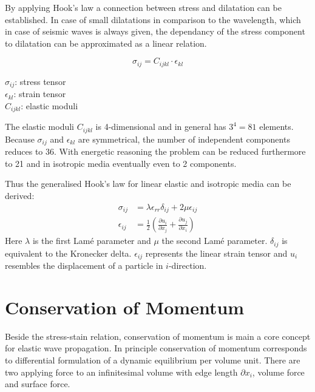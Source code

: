 \documentclass[pdftex,a4paper,parskip,listof=totoc,bibliography=totoc,onehalfspacing,12pt]{scrreprt}
\begin{document}
By applying Hook's law a connection between stress and dilatation  can be established. In case of small dilatations in comparison to the wavelength, which in case of seismic waves is always given, the dependancy of the stress component to dilatation can be approximated as a linear relation.

\begin{minipage}[t]{0.4\textwidth}
\begin{equation}
	\sigma_{ij} = C_{ijkl} \cdot\epsilon_{kl}
\end{equation}
\end{minipage}
\hfill
\begin{minipage}[t]{0.45\textwidth}
$\sigma_{ij}$: stress tensor\\
$\epsilon_{kl}$: strain tensor\\
$C_{ijkl}$: elastic moduli
\end{minipage}

The elastic moduli $C_{ijkl}$ is \num{4}-dimensional and  in general has $3^4 = 81$ elements. Because $\sigma_{ij}$ and $\epsilon_{kl}$ are symmetrical, the number of independent components reduces to \num{36}. With energetic reasoning the problem can be reduced furthermore to \num{21} and in isotropic media eventually even to \num{2} components. 

Thus the generalised Hook's law for linear elastic and isotropic media can be derived:
\begin{align}
	\sigma_{ij} &= \lambda \epsilon_{rr} \delta_{ij} + 2 \mu \epsilon_{ij}\label{eqn:GenHook}\\
	\epsilon_{ij} &= \frac{1}{2} \left( \frac{\partial u_i}{\partial x_j} + \frac{\partial u_j}{\partial x_i} \right)\label{eqn:Dehnij}
\end{align}
Here $\lambda$ is the first Lam\'{e} parameter and $\mu$ the second Lam\'{e} parameter. $\delta_{ij}$ is equivalent to the Kronecker delta. $\epsilon_{ij}$ represents the linear strain tensor and $u_i$ resembles the displacement of a particle in $i$-direction.

\section{Conservation of Momentum}

Beside the stress-stain relation, conservation of momentum is main a core concept for elastic wave propagation. In principle conservation of momentum corresponds to differential formulation of a dynamic equilibrium per volume unit. There are two applying force to an infinitesimal volume with edge length $\partial x_i$, volume force and surface force. \citep{landau:97}
\end{document}
